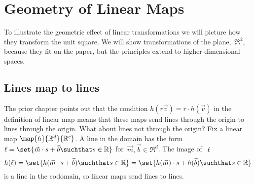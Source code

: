 \chapter{Geometry of Linear Maps}

To illustrate the geometric effect of linear transformations 
we will picture how they transform the unit square.
We will show transformations of the plane,~$\Re^2$,
because they fit on the paper, but the principles extend to 
higher-dimensional spaces.




\section{Lines map to lines}
The prior chapter points out that 
the condition $h(r\vec{v})=r\cdot h(\vec{v})$ in the definition
of linear map means that
these maps send lines through the origin to lines through the origin.
What about lines not through the origin?
Fix a linear map $\map{h}{\Re^d}{\Re^c}$.
A line in the domain has the form 
$\ell = \set{\vec{m}\cdot s +\vec{b}\suchthat s\in\Re}$
for~$\vec{m}, \vec{b}\in\Re^d$.
The image of~$\ell$
\begin{equation*}
  h(\ell)=\set{h(\vec{m}\cdot s+\vec{b})\suchthat s\in\Re}
  =\set{h(\vec{m})\cdot s+h(\vec{b})\suchthat s\in\Re}
\end{equation*}
is a line in the codomain, so linear maps send lines to lines. 


